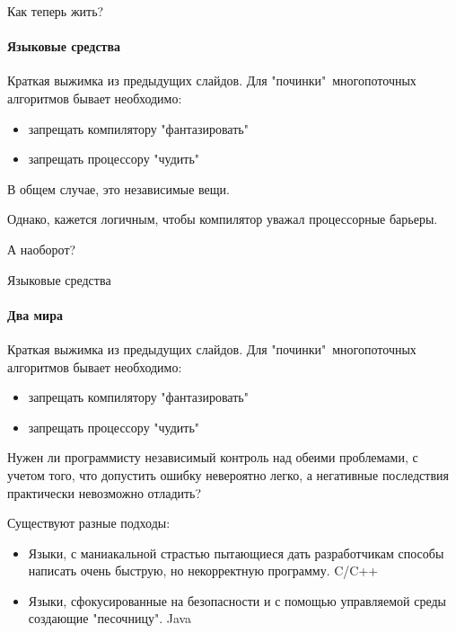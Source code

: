 \begin{frame}[t]{Как теперь жить?}
\framesubtitle{Языковые средства}

Краткая выжимка из предыдущих слайдов. Для "починки"\ многопоточных алгоритмов бывает необходимо:
\begin{itemize}
  \item запрещать компилятору "фантазировать"
  \item запрещать процессору "чудить"
\end{itemize}

\pause
В общем случае, это независимые вещи. 

\pause
Однако, кажется логичным, чтобы компилятор уважал процессорные барьеры.

\pause
А наоборот?
\end{frame}

\begin{frame}[t]{Языковые средства}
\framesubtitle{Два мира}

Краткая выжимка из предыдущих слайдов. Для "починки"\ многопоточных алгоритмов бывает необходимо:
\begin{itemize}
  \item запрещать компилятору "фантазировать"
  \item запрещать процессору "чудить"
\end{itemize}

Нужен ли программисту независимый контроль над обеими проблемами, с учетом того, что допустить ошибку невероятно легко, а негативные последствия практически невозможно отладить?

\pause
Существуют разные подходы:
\begin{itemize}
  
  \pause
  \item Языки, с маниакальной страстью пытающиеся дать разработчикам способы написать очень быструю, но некорректную программу.
  \pause
  C/C++

  \pause
  \item Языки, сфокусированные на безопасности и с помощью управляемой среды создающие "песочницу".
  \pause
  Java
\end{itemize}
\end{frame}


